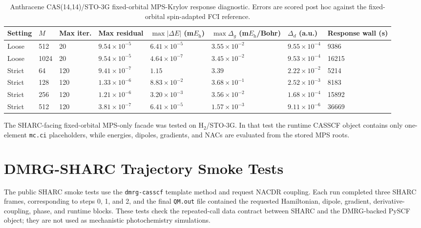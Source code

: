 \documentclass[manuscript=suppinfo]{achemso}
\newcommand{\Eh}{E_{\mathrm{h}}}
\begin{document}
\begin{table}[htbp]
\centering
\scriptsize
\setlength{\tabcolsep}{3pt}
\caption{Anthracene CAS(14,14)/STO-3G fixed-orbital MPS-Krylov response
diagnostic.  Errors are scored post hoc against the fixed-orbital
spin-adapted FCI reference.}
\label{tab:si-anth-response}
\begin{tabular}{P{0.13\textwidth}P{0.08\textwidth}P{0.08\textwidth}P{0.10\textwidth}P{0.12\textwidth}P{0.12\textwidth}P{0.13\textwidth}P{0.13\textwidth}}
\toprule
Setting & $M$ & Max iter. & Max residual & $\max|\Delta E|$ (m$\Eh$) & $\max\Delta_g$ (m$\Eh$/Bohr) & $\Delta_d$ (a.u.) & Response wall (s) \\
\midrule
Loose & 512 & 20 & $9.54\times10^{-5}$ & $6.41\times10^{-5}$ & $3.55\times10^{-2}$ & $9.55\times10^{-4}$ & 9386 \\
Loose & 1024 & 20 & $9.54\times10^{-5}$ & $4.64\times10^{-7}$ & $3.45\times10^{-2}$ & $9.53\times10^{-4}$ & 16215 \\
Strict & 64 & 120 & $9.41\times10^{-7}$ & $1.15$ & $3.39$ & $2.22\times10^{-2}$ & 5214 \\
Strict & 128 & 120 & $1.33\times10^{-6}$ & $8.83\times10^{-2}$ & $3.68\times10^{-1}$ & $2.52\times10^{-3}$ & 8183 \\
Strict & 256 & 120 & $1.21\times10^{-6}$ & $3.20\times10^{-3}$ & $3.56\times10^{-2}$ & $1.68\times10^{-4}$ & 15892 \\
Strict & 512 & 120 & $3.81\times10^{-7}$ & $6.41\times10^{-5}$ & $1.57\times10^{-3}$ & $9.11\times10^{-6}$ & 36669 \\
\bottomrule
\end{tabular}
\end{table}

The SHARC-facing fixed-orbital MPS-only facade was tested on H$_2$/STO-3G.  In
that test the runtime CASSCF object contains only one-element \texttt{mc.ci}
placeholders, while energies, dipoles, gradients, and NACs are evaluated from
the stored MPS roots.

\section{DMRG-SHARC Trajectory Smoke Tests}

The public SHARC smoke tests use the \texttt{dmrg-casscf} template method and
request NACDR coupling.  Each run completed three SHARC frames, corresponding to
steps 0, 1, and 2, and the final \texttt{QM.out} file contained the requested
Hamiltonian, dipole, gradient, derivative-coupling, phase, and runtime blocks.
These tests check the repeated-call data contract between SHARC and the
DMRG-backed PySCF object; they are not used as mechanistic photochemistry
simulations.
\end{document}
